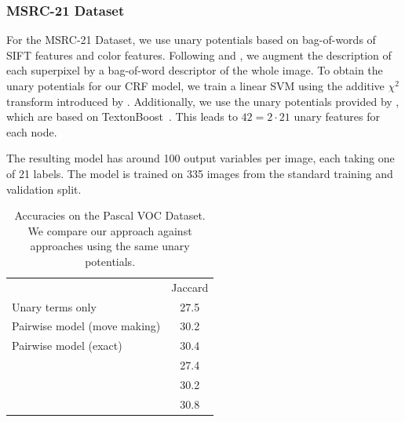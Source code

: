 \subsubsection{MSRC-21 Dataset}
For the MSRC-21 Dataset, we use unary potentials based on bag-of-words of SIFT
features and color features.  Following \citet{lucchi2011spatial} and
\citet{fulkerson2009class}, we augment the description of each superpixel by a
bag-of-word descriptor of the whole image. To obtain the unary potentials for
our CRF model, we train a linear SVM using the additive $\chi^2$ transform
introduced by \citet{vedaldi2010efficient}. Additionally, we use the unary
potentials provided by \citet{krahenbuhl2012efficient}, which are based on
TextonBoost~\citep{shotton2006textonboost}. This leads to $42 = 2 \cdot 21$
unary features for each node.

The resulting model has around 100 output variables per image, each taking one of 21
labels. The model is trained on 335 images from the standard training and
validation split.

\begin{table}
    \begin{center}
    \begin{tabularx}{\linewidth}{@{\extracolsep{\fill}}lc}
        \toprule
                    & Jaccard \\
        \cmidrule{1-2}
    Unary terms only &  27.5 \\
    Pairwise model (move making)& 30.2\\
    Pairwise model (exact) & 30.4\\
        \cmidrule{1-2}
    \citet{dann2012pottics} & 27.4\\
    \citet{krahenbuhl2012efficient} & 30.2\\
    \citet{krahenbuhlparameter} & 30.8\\
    \bottomrule
    \end{tabularx}
    \end{center}
    \caption{Accuracies on the Pascal VOC Dataset. We compare our approach
    against approaches using the same unary potentials.}
    
\end{table}

